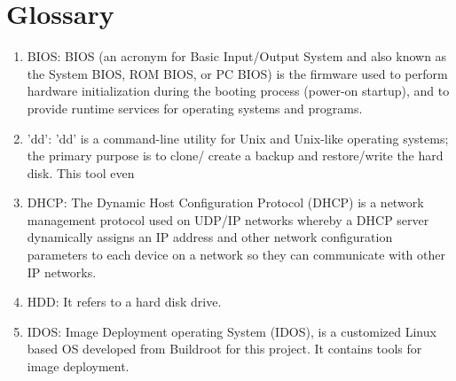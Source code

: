 \documentclass[a4paper,12pt]{article}
\begin{document}
\section{\fontsize{16pt}{1em} Glossary}
\begin{enumerate}
       \item BIOS: BIOS (an acronym for Basic Input/Output System and also known as the System BIOS, ROM BIOS, or PC BIOS) is the firmware used to perform hardware initialization during the booting process (power-on startup), and to provide runtime services for operating systems and programs.
    \item 'dd': 'dd' is a command-line utility for Unix and Unix-like operating systems; the primary purpose is to clone/ create a backup and restore/write the hard disk. This tool even
    \item DHCP: The Dynamic Host Configuration Protocol (DHCP) is a network management protocol used on UDP/IP networks whereby a DHCP server dynamically assigns an IP address and other network configuration parameters to each device on a network so they can communicate with other IP networks.
    \item HDD: It refers to a hard disk drive.
    \item IDOS: Image Deployment operating System (IDOS), is a customized Linux based OS developed from Buildroot for this project. It contains tools for image deployment.
  

\end{enumerate}
\end{document}

